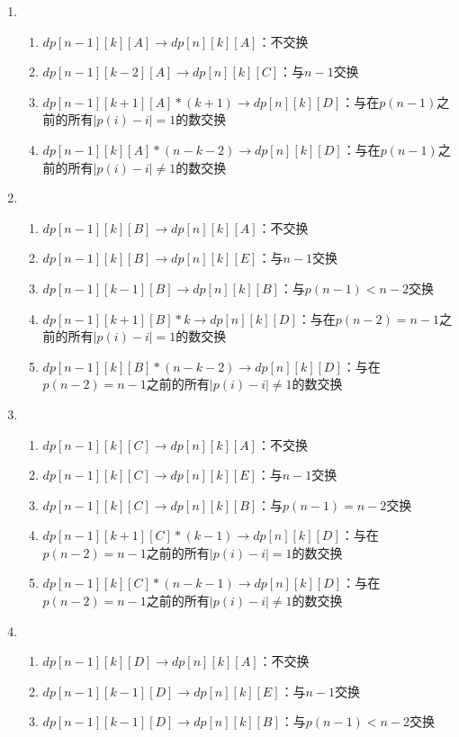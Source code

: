 \documentclass[a4paper]{ctexart}
\begin{document}
	\begin{enumerate}[A]
		\item \begin{enumerate}
			\item $dp[n-1][k][A]\rightarrow dp[n][k][A]$：不交换
			\item $dp[n-1][k-2][A]\rightarrow dp[n][k][C]$：与$n-1$交换
			\item $dp[n-1][k+1][A]*(k+1)\rightarrow dp[n][k][D]$：与在$p(n-1)$之前的所有$|p(i)-i|=1$的数交换
			\item $dp[n-1][k][A]*(n-k-2)\rightarrow dp[n][k][D]$：与在$p(n-1)$之前的所有$|p(i)-i|\neq 1$的数交换
		\end{enumerate}
		\item \begin{enumerate}
			\item $dp[n-1][k][B]\rightarrow dp[n][k][A]$：不交换
			\item $dp[n-1][k][B]\rightarrow dp[n][k][E]$：与$n-1$交换
			\item $dp[n-1][k-1][B]\rightarrow dp[n][k][B]$：与$p(n-1)<n-2$交换
			\item $dp[n-1][k+1][B]*k\rightarrow dp[n][k][D]$：与在$p(n-2)=n-1$之前的所有$|p(i)-i|=1$的数交换
			\item $dp[n-1][k][B]*(n-k-2)\rightarrow dp[n][k][D]$：与在$p(n-2)=n-1$之前的所有$|p(i)-i|\neq 1$的数交换
		\end{enumerate}
		\item \begin{enumerate}
			\item $dp[n-1][k][C]\rightarrow dp[n][k][A]$：不交换
			\item $dp[n-1][k][C]\rightarrow dp[n][k][E]$：与$n-1$交换
			\item $dp[n-1][k][C]\rightarrow dp[n][k][B]$：与$p(n-1)=n-2$交换
			\item $dp[n-1][k+1][C]*(k-1)\rightarrow dp[n][k][D]$：与在$p(n-2)=n-1$之前的所有$|p(i)-i|=1$的数交换
			\item $dp[n-1][k][C]*(n-k-1)\rightarrow dp[n][k][D]$：与在$p(n-2)=n-1$之前的所有$|p(i)-i|\neq 1$的数交换
		\end{enumerate}
		\item \begin{enumerate}
			\item $dp[n-1][k][D]\rightarrow dp[n][k][A]$：不交换
			\item $dp[n-1][k-1][D]\rightarrow dp[n][k][E]$：与$n-1$交换
			\item $dp[n-1][k-1][D]\rightarrow dp[n][k][B]$：与$p(n-1)<n-2$交换

\end{enumerate}
\end{enumerate}
\end{document}

